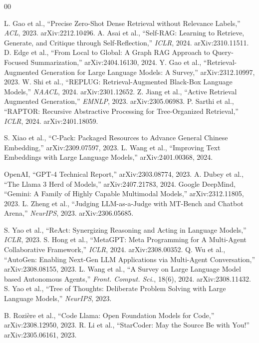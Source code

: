 \documentclass[conference]{IEEEtran}
\begin{document}
\begin{thebibliography}{00}

 L. Gao et al., ``Precise Zero-Shot Dense Retrieval without Relevance Labels,'' \textit{ACL}, 2023. arXiv:2212.10496.
 A. Asai et al., ``Self-RAG: Learning to Retrieve, Generate, and Critique through Self-Reflection,'' \textit{ICLR}, 2024. arXiv:2310.11511.
 D. Edge et al., ``From Local to Global: A Graph RAG Approach to Query-Focused Summarization,'' arXiv:2404.16130, 2024.
 Y. Gao et al., ``Retrieval-Augmented Generation for Large Language Models: A Survey,'' arXiv:2312.10997, 2023.
 W. Shi et al., ``REPLUG: Retrieval-Augmented Black-Box Language Models,'' \textit{NAACL}, 2024. arXiv:2301.12652.
 Z. Jiang et al., ``Active Retrieval Augmented Generation,'' \textit{EMNLP}, 2023. arXiv:2305.06983.
 P. Sarthi et al., ``RAPTOR: Recursive Abstractive Processing for Tree-Organized Retrieval,'' \textit{ICLR}, 2024. arXiv:2401.18059.

 S. Xiao et al., ``C-Pack: Packaged Resources to Advance General Chinese Embedding,'' arXiv:2309.07597, 2023.
 L. Wang et al., ``Improving Text Embeddings with Large Language Models,'' arXiv:2401.00368, 2024.

 OpenAI, ``GPT-4 Technical Report,'' arXiv:2303.08774, 2023.
 A. Dubey et al., ``The Llama 3 Herd of Models,'' arXiv:2407.21783, 2024.
 Google DeepMind, ``Gemini: A Family of Highly Capable Multimodal Models,'' arXiv:2312.11805, 2023.
 L. Zheng et al., ``Judging LLM-as-a-Judge with MT-Bench and Chatbot Arena,'' \textit{NeurIPS}, 2023. arXiv:2306.05685.

 S. Yao et al., ``ReAct: Synergizing Reasoning and Acting in Language Models,'' \textit{ICLR}, 2023.
 S. Hong et al., ``MetaGPT: Meta Programming for A Multi-Agent Collaborative Framework,'' \textit{ICLR}, 2024. arXiv:2308.00352.
 Q. Wu et al., ``AutoGen: Enabling Next-Gen LLM Applications via Multi-Agent Conversation,'' arXiv:2308.08155, 2023.
 L. Wang et al., ``A Survey on Large Language Model based Autonomous Agents,'' \textit{Front. Comput. Sci.}, 18(6), 2024. arXiv:2308.11432.
 S. Yao et al., ``Tree of Thoughts: Deliberate Problem Solving with Large Language Models,'' \textit{NeurIPS}, 2023.

 B. Rozi\`{e}re et al., ``Code Llama: Open Foundation Models for Code,'' arXiv:2308.12950, 2023.
 R. Li et al., ``StarCoder: May the Source Be with You!'' arXiv:2305.06161, 2023.

\end{thebibliography}
\end{document}
